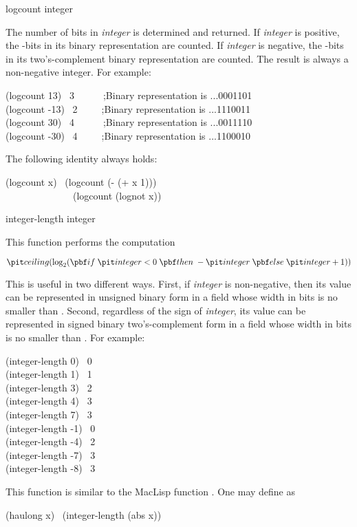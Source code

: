 \begin{defun}[Function]
logcount integer

The number of bits in {\it integer} is determined and returned.
If {\it integer} is positive, the -bits in its binary
representation are counted.  If {\it integer} is negative,
the -bits in its two's-complement binary representation are counted.
The result is always a non-negative integer.
For example:
\begin{lisp}
(logcount 13) \EV\ 3~~~~~~;{\rm Binary representation is} ...0001101 \\
(logcount -13) \EV\ 2~~~~~;{\rm Binary representation is} ...1110011 \\
(logcount 30) \EV\ 4~~~~~~;{\rm Binary representation is} ...0011110 \\
(logcount -30) \EV\ 4~~~~~;{\rm Binary representation is} ...1100010
\end{lisp}
The following identity always holds:
\begin{lisp}
(logcount x) \EQ\ (logcount (- (+ x 1))) \\
~~~~~~~~~~~~~\EQ\ (logcount (lognot x))
\end{lisp}
\end{defun}

\begin{defun}[Function]
integer-length integer

This function performs the computation
\begin{tabbing}
$ {\it ceiling}(\log_2 ({\bf if}\; {\it integer} < 0 \;{\bf then} \;
    -{\it integer} \;{\bf else}\; {\it integer}+1)) $
\end{tabbing}
This is useful in two different ways.
First, if {\it integer} is non-negative, then its value can be represented
in unsigned binary form in a field whose width in bits is
no smaller than .
Second, regardless of the sign of {\it integer}, its value can be
represented in signed binary two's-complement form in a field
whose width in bits is no smaller than .
For example:
\begin{lisp}
(integer-length 0) \EV\ 0 \\
(integer-length 1) \EV\ 1 \\
(integer-length 3) \EV\ 2 \\
(integer-length 4) \EV\ 3 \\
(integer-length 7) \EV\ 3 \\
(integer-length -1) \EV\ 0 \\
(integer-length -4) \EV\ 2 \\
(integer-length -7) \EV\ 3 \\
(integer-length -8) \EV\ 3
\end{lisp}

\beforenoterule
\begin{incompatibility}
This function is similar to the MacLisp
function .  One may define  as
\begin{lisp}
(haulong x) \EQ\ (integer-length (abs x))
\end{lisp}
\end{incompatibility}
\afternoterule
\end{defun}


